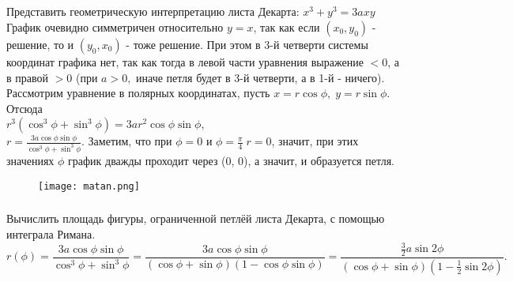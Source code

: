 \subsection{}
\subsubsection{}
Представить геометрическую интерпретацию листа Декарта: $x^3 + y^3 = 3axy$ \\

\noindent График очевидно симметричен относительно $y=x$, так как если \((x_0, y_0)\) - решение, то и  \((y_0, x_0)\) - тоже решение. При этом в 3-й четверти системы координат графика нет, так как тогда в левой части уравнения выражение $< 0$, а в правой $> 0$ (при $a > 0,$ иначе петля будет в 3-й четверти, а в 1-й - ничего). Рассмотрим уравнение в полярных координатах, пусть \(x = r\cos\phi, \; y=r\sin\phi\). Отсюда \\
\(r^3(\cos^3\phi + \sin^3\phi) = 3ar^2\cos\phi\sin\phi\), \\
\(r = \frac{3a\cos\phi\sin\phi}{\cos^3\phi + \sin^3\phi}\). Заметим, что при \(\phi = 0 \text{ и } \phi = \frac{\pi}{4} \; r =0\), значит, при этих значениях \(\phi\) график дважды проходит через (0, 0), а значит, и образуется петля.
\begin{figure}[h]
    \centering
    \texttt{[image: matan.png]}
\end{figure}
\subsubsection{}
Вычислить площадь фигуры, ограниченной петлёй листа Декарта, с помощью интеграла Римана. \\

\[r(\phi) = \frac{3a\cos\phi\sin\phi}{\cos^3\phi + \sin^3\phi} = \frac{3a\cos\phi\sin\phi}{(\cos\phi + \sin\phi)(1-\cos\phi\sin\phi)} = \frac{\frac{3}{2}a\sin{2\phi}}{(\cos\phi+\sin\phi)(1 - \frac{1}{2}\sin{2\phi})}.\]


